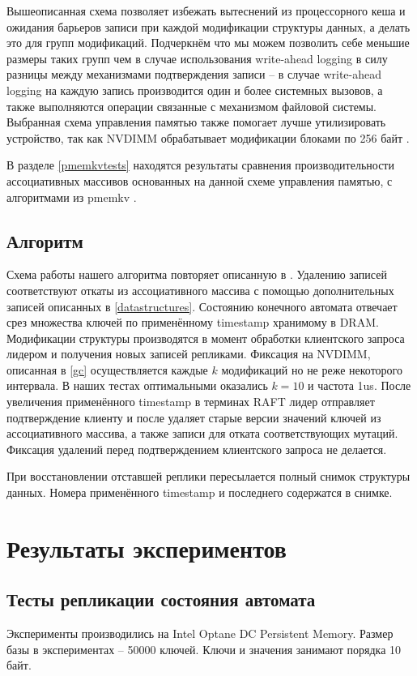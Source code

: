 \documentclass[pdftex,ptm,12pt,a4paper]{report}
\theoremstyle{definition}
\begin{document}
Вышеописанная схема позволяет избежать вытеснений из процессорного кеша и ожидания барьеров записи при каждой модификации структуры данных, а делать это для групп модификаций.
Подчеркнём что мы можем позволить себе меньшие размеры таких групп чем в случае использования write-ahead logging в силу разницы между механизмами подтверждения записи --
в случае write-ahead logging на каждую запись производится один и более системных вызовов, а также выполняются операции связанные с механизмом файловой системы.
Выбранная схема управления памятью также помогает лучше утилизировать устройство, так как NVDIMM обрабатывает модификации блоками по 256 байт \cite{izraelevitz2019basic}.

В разделе \ref{pmemkvtests} находятся результаты сравнения производительности ассоциативных массивов основанных на данной схеме управления памятью, с алгоритмами из pmemkv \cite{pmemkv}.

\section{Алгоритм}
Схема работы нашего алгоритма повторяет описанную в \cite{raftpaper}. Удалению записей соответствуют откаты из ассоциативного массива с помощью дополнительных записей описанных
в \ref{datastructures}. Состоянию конечного автомата отвечает срез множества ключей по применённому timestamp хранимому в DRAM. Модификации структуры производятся в момент обработки
клиентского запроса лидером и получения новых записей репликами. Фиксация на NVDIMM, описанная в \ref{gc} осуществляется каждые $k$ модификаций но не реже некоторого интервала.
В наших тестах оптимальными оказались $k=10$ и частота 1us. После увеличения применённого timestamp в терминах RAFT лидер отправляет подтверждение клиенту и после удаляет
старые версии значений ключей из ассоциативного массива, а также записи для отката соответствующих мутаций. Фиксация удалений перед подтверждением клиентского запроса не делается.

При восстановлении отставшей реплики пересылается полный снимок структуры данных. Номера применённого timestamp и последнего содержатся в снимке.

\chapter{Результаты экспериментов}
\section{Тесты репликации состояния автомата}
Эксперименты производились на Intel Optane DC Persistent Memory.
Размер базы в экспериментах -- 50000 ключей. Ключи и значения занимают порядка 10 байт.
\end{document}
